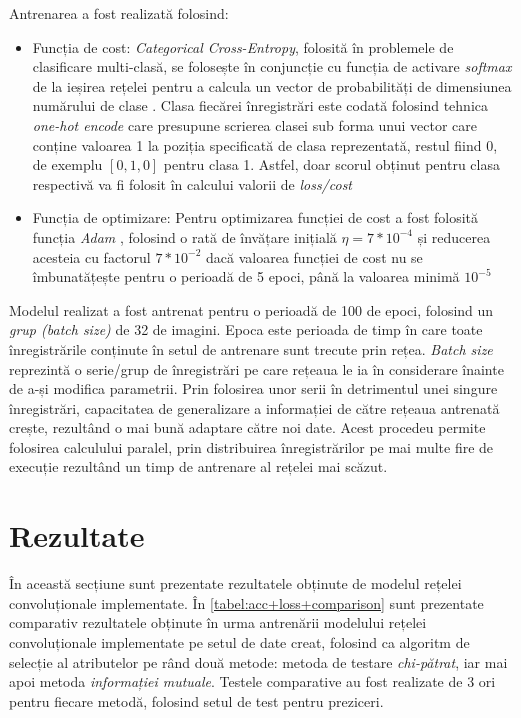 Antrenarea a fost realizată folosind:
\begin{itemize}
\item Funcția de cost: \textit{Categorical Cross-Entropy}, folosită în problemele de clasificare multi-clasă, se folosește în conjuncție cu funcția de activare \textit{softmax} de la ieșirea rețelei pentru a calcula un vector de probabilități de dimensiunea numărului de clase \cite{online:CCE-loss}. Clasa fiecărei înregistrări este codată folosind tehnica \textit{one-hot encode} care presupune scrierea clasei sub forma unui vector care conține valoarea 1 la poziția specificată de clasa reprezentată, restul fiind 0, de exemplu $[0,1,0]$ pentru clasa 1. Astfel, doar scorul obținut pentru clasa respectivă va fi folosit în calcului valorii de \textit{loss/cost}
\item Funcția de optimizare: Pentru optimizarea funcției de cost a fost folosită funcția \textit{Adam} \cite{kingma2014adam}, folosind o rată de învățare inițială $\eta=7*10^{-4}$ și reducerea acesteia cu factorul $7*10^{-2}$ dacă valoarea funcției de cost nu se îmbunatățește pentru o perioadă de 5 epoci, până la valoarea minimă $10^{-5}$
\end{itemize}

Modelul realizat a fost antrenat pentru o perioadă de 100 de epoci, folosind un \textit{grup (batch size)} de 32 de imagini. Epoca este perioada de timp în care toate înregistrările conținute în setul de antrenare sunt trecute prin rețea. \textit{Batch size} reprezintă o serie/grup de înregistrări pe care rețeaua le ia în considerare înainte de a-și modifica parametrii. Prin folosirea unor serii în detrimentul unei singure înregistrări, capacitatea de generalizare a informației de către rețeaua antrenată crește, rezultând o mai bună adaptare către noi date. Acest procedeu permite folosirea calculului paralel, prin distribuirea înregistrărilor pe mai multe fire de execuție rezultând un timp de antrenare al rețelei mai scăzut. 

\section{Rezultate}
În această secțiune sunt prezentate rezultatele obținute de modelul rețelei convoluționale implementate. În \autoref{tabel:acc+loss+comparison} sunt prezentate comparativ rezultatele obținute în urma antrenării modelului rețelei convoluționale implementate pe setul de date creat, folosind ca algoritm de selecție al atributelor pe rând două metode: metoda de testare \textit{chi-pătrat}, iar mai apoi metoda \textit{informației mutuale}. Testele comparative au fost realizate de 3 ori pentru fiecare metodă, folosind setul de test pentru preziceri.

